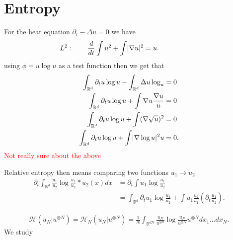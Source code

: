 \section{Entropy}
\begin{definition}[Entropy]
 For the heat equation $\partial_t - \Delta  u = 0$ we have 
 \begin{align*}
   \hspace{-20mm} L^2 :\qquad \frac{d}{dt} \int  u ^2 + \int  \abs{\nabla u}^2  = u
 .\end{align*}
using $\phi  = u \log u$ as a test function then  we get that 
\begin{align*}
  \int_{\mathbb{R}^{d} } \partial_t u \log u - \int_{\mathbb{R}^{d} } \Delta  u \log_u  &= 0\\
  \int_{\mathbb{R}^{d} } \partial_t u \log u + \int  \nabla u \frac{\nabla u}{u} &=0 \\
  \int_{\mathbb{R}^{d} } \partial_t u \log u +   \int (\nabla \sqrt{u} )^2  &=0 \\
  \int_{\mathbb{R}^{d} } \partial_t u \log u +  \int  \lvert\nabla \log u\rvert ^2 u &=0 
.\end{align*}
\textcolor{Red}{Not really sure about the above }
\end{definition}
\begin{definition}
 Relative entropy then means comparing two functions $u_1 \to u_{2}$  
 \begin{align*}
   \partial_t \int_{\mathbb{R}^{d} }\frac{u_{1}}{u_{2}} \log \frac{u_{1}}{u_{2}}*u_{2}(x) dx &= \partial_t \int u_{1} \log \frac{u_{1}}{u_{2}}\\
                                                                                             &= \int_{\mathbb{R}^{d} } \partial_t u_{1} \log \frac{u_{1}}{u_{2}} + \int u_{1} \frac{u_{2}}{u_{1}}(\partial_t \frac{u_{1}}{u_{2}}) 
 .\end{align*}
\end{definition}
\begin{align*}
  \mathcal{H}(u_N | u^{\otimes N}) = \mathcal{H}_N(u_N | u^{\otimes N} ) = \frac{1}{N} \int_{\mathbb{R}^{dN} } \frac{u_N}{u^{\otimes n} } \log \frac{u_N}{u^{\otimes N} } u^{\otimes N}  dx_{1}\ldots dx_N
.\end{align*}
We study
